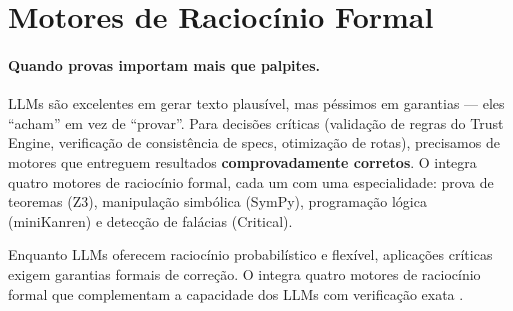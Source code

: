 \section{Motores de Raciocínio Formal}
\label{sec:motor formal}
\nivelphd

\paragraph{Quando provas importam mais que palpites.} LLMs são excelentes em
gerar texto plausível, mas péssimos em garantias --- eles ``acham'' em vez
de ``provar''. Para decisões críticas (validação de regras do Trust Engine,
verificação de consistência de specs, otimização de rotas), precisamos de
motores que entreguem resultados \textbf{comprovadamente corretos}. O
\opencodeeco{} integra quatro motores de raciocínio formal, cada um com uma
especialidade: prova de teoremas (Z3), manipulação simbólica (SymPy),
programação lógica (miniKanren) e detecção de falácias (Critical).

Enquanto LLMs oferecem raciocínio probabilístico e flexível, aplicações
críticas exigem garantias formais de correção. O \opencodeeco{} integra
quatro motores de raciocínio formal que complementam a capacidade dos LLMs
com verificação exata \cite{opencode2026ecosystem}.
